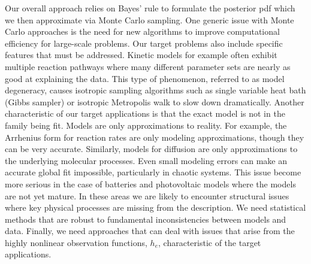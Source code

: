 \documentclass[11pt]{article}
\begin{document}
Our overall approach relies on Bayes' rule to formulate
the posterior pdf which we then approximate via Monte Carlo sampling. One generic issue with Monte Carlo approaches
is the need for new algorithms to improve computational efficiency for large-scale problems.
Our target problems also include specific features that must be addressed.
Kinetic models for example often exhibit multiple reaction pathways where
many different parameter sets are nearly as good at explaining the data.
This type of phenomenon, referred to as model degeneracy,
causes isotropic sampling algorithms such as single variable heat bath (Gibbs sampler) or isotropic
Metropolis walk to slow down dramatically.
Another characteristic of our target applications is that
the exact model is not in the family being fit.
Models are only approximations to reality.
For example, the Arrhenius form for reaction rates are only modeling approximations, though they can be very accurate.
Similarly, models for diffusion are only approximations to the underlying molecular processes.
Even small modeling errors can make an accurate global fit impossible, particularly in chaotic systems.
This issue become more serious in the case of batteries and photovoltaic models where the models
are not yet mature.  In these areas we are likely to encounter structural issues where key physical
processes are missing from the description.
We need statistical methods that are robust to fundamental inconsistencies between models and data.
Finally, we need approaches that can deal with issues that arise from the highly nonlinear observation
functions, $h_e$, characteristic of the target applications.
\end{document}
